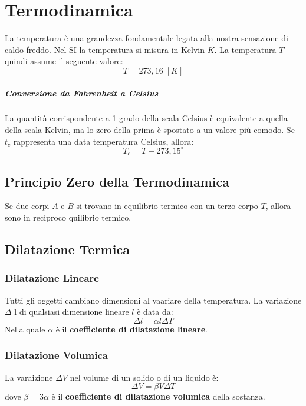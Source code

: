 \chapter{Termodinamica} La temperatura è una grandezza fondamentale legata alla
nostra sensazione di caldo-freddo. Nel SI la temperatura si misura in Kelvin 
$K$. La temperatura $T$ quindi assume il seguente valore:
    \begin{equation*}
        T = 273,16 \; [K]
    \end{equation*}

    \paragraph{Conversione da Fahrenheit a Celsius} La quantità corrispondente
    a 1 grado della scala Celsius è equivalente a quella della scala Kelvin, ma
    lo zero della prima è spostato a un valore più comodo. Se $t_c$ rappresenta
    una data temperatura Celsius, allora:
        \begin{equation}
            T_c = T - 273,15^\circ 
        \end{equation}

    \section{Principio Zero della Termodinamica} Se due corpi $A$ e $B$ si 
    trovano in equilibrio termico con un terzo corpo $T$, allora sono in 
    reciproco quilibrio termico.




    \section{Dilatazione Termica}
        \subsection{Dilatazione Lineare} Tutti gli oggetti cambiano dimensioni
        al vaariare della temperatura. La variazione $\Delta$ l di qualsiasi 
        dimensione lineare $l$ è data da:
            \begin{equation}
                \Delta l = \alpha l \Delta T
            \end{equation}
        Nella quale $\alpha$ è il \textbf{coefficiente di dilatazione lineare}.

        \subsection{Dilatazione Volumica} La varaizione $\Delta V$ nel volume 
        di un solido o di un liquido è:
            \begin{equation}
                \Delta V = \beta V \Delta T
            \end{equation}
        dove $\beta = 3\alpha$ è il \textbf{coefficiente di dilatazione 
        volumica} della sostanza.

